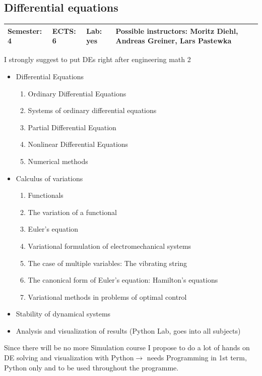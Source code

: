\documentclass[12pt,twoside,fleqn,a4paper]{article}
\newcommand{\lp}[1]{{\color{red} #1}}  %
\begin{document}
\subsection{Differential equations}
\begin{tabular}{llll} \hline
\textbf{Semester:} 4 & \textbf{ECTS:} 6 & \textbf{Lab:} yes & \textbf{Possible instructors:} Moritz Diehl, Andreas Greiner, Lars Pastewka \\
\hline
\end{tabular}
\lp{I strongly suggest to put DEs right after engineering math 2}
\begin{itemize}
\setlength\itemsep{0cm}
\item Differential Equations
\begin{enumerate}
    \item Ordinary Differential Equations
    \item Systems of ordinary differential equations
    \item Partial Differential Equation
    \item Nonlinear Differential Equations
    \item Numerical methods
\end{enumerate}
\item Calculus of variations
\begin{enumerate}
    \item Functionals
    \item The variation of a functional
    \item Euler's equation
    \item Variational formulation of electromechanical systems
    \item The case of multiple variables: The vibrating string
    \item The canonical form of Euler's equation: Hamilton's equations
    \item Variational methods in problems of optimal control
\end{enumerate}

\item Stability of dynamical systems
\item Analysis and visualization of results (Python Lab, goes into all subjects)
\end{itemize}
\lp{Since there will be no more Simulation course I propose to do a lot of hands on DE solving
and visualization with Python$\rightarrow$ needs Programming in 1st term, Python only and to be used throughout the programme.}
\end{document}

